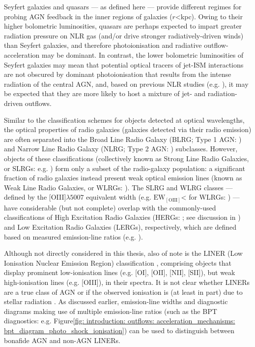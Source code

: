 Seyfert galaxies and quasars --- as defined here --- provide different regimes for probing AGN feedback in the inner regions of galaxies ($r$\;\textless{}\;kpc). Owing to their higher bolometric luminosities, quasars are perhaps expected to impart greater radiation pressure on NLR gas (and/or drive stronger radiatively-driven winds) than Seyfert galaxies, and therefore photoionisation and radiative outflow-acceleration may be dominant. In contrast, the lower bolometric luminosities of Seyfert galaxies may mean that potential optical tracers of jet-ISM interactions are not obscured by dominant photoionisation that results from the intense radiation of the central AGN, and, based on previous NLR studies (e.g. \citealt{Whittle1992a, Axon1998, Crenshaw2000_N1068, Das2007}), it may be expected that they are more likely to host a mixture of jet- and radiation-driven outflows.

Similar to the classification schemes for objects detected at optical wavelengths, the optical properties of radio galaxies (galaxies detected via their radio emission) are often separated into the Broad Line Radio Galaxy (BLRG; Type 1 AGN: \citealt{Osterbrock1976, Grandi1977}) and Narrow Line Radio Galaxy (NLRG; Type 2 AGN: \citealt{Costero1977}) subclasses. However, objects of these classifications (collectively known as Strong Line Radio Galaxies, or SLRGs: e.g. \citealt{RamosAlmeida2011}) form only a subset of the radio-galaxy population: a significant fraction of radio galaxies instead present weak optical emission lines (known as Weak Line Radio Galaxies, or WLRGs: \citealt{HineLongair1979, Best2012}). The SLRG and WLRG classes --- defined by the [OIII]$\lambda5007$ equivalent width (e.g. $\mathrm{EW}_\mathrm{[OIII]}$\;\textless{}\;{\AA} for WLRGs: \citealt{Tadhunter1998}) --- have considerable (but not complete) overlap with the commonly-used classifications of High Excitation Radio Galaxies (HERGs: \citealt{Laing1994, Tadhunter1998, Best2012}; see discussion in \citealt{Tadhunter2016}) and Low Excitation Radio Galaxies (LERGs), respectively, which are defined based on measured emission-line ratios (e.g. \citealt{Buttiglione2010}).

Although not directly considered in this thesis, also of note is the LINER (Low Ionisation Nuclear Emission Region) classification \citep{Heckman1980}, comprising objects that display prominent low-ionisation lines (e.g. [OI], [OII], [NII], [SII]), but weak high-ionisation lines (e.g. [OIII]), in their spectra. It is not clear whether LINERs are a true class of AGN or if the observed ionisation is (at least in part) due to stellar radiation \citep{CidFernandes2011, Singh2013, Coldwell2018, Frederick2019}. As discussed earlier, emission-line widths and diagnostic diagrams making use of multiple emission-line ratios (such as the BPT diagnostics: e.g. Figure\;\ref{fig: introduction: outflows: acceleration_mechanisms: bpt_diagram_photo_shock_ionisation}) can be used to distinguish between bonafide AGN and non-AGN LINERs.



